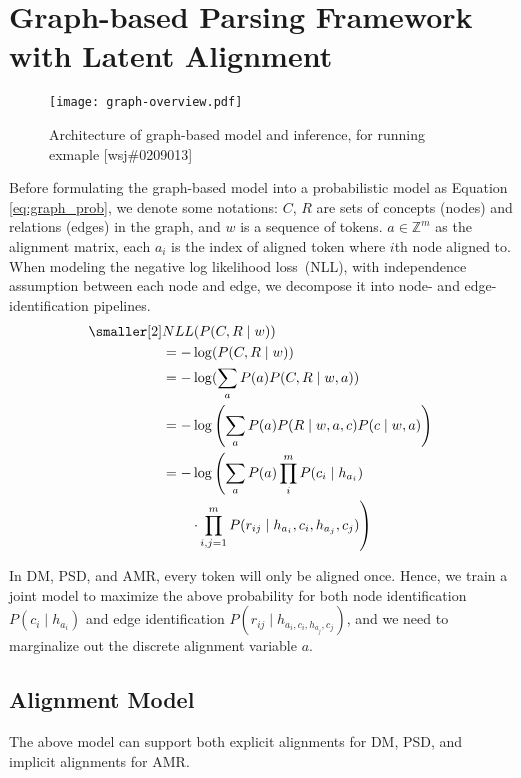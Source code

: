 \section{Graph-based Parsing Framework with Latent Alignment}
\label{sec:lex:graph-based}

\begin{figure}[h]
\centering
\texttt{[image: graph-overview.pdf]}
\caption{\label{fig:graph-based-inference} Architecture of graph-based model and inference, for running exmaple [wsj\#0209013]}
\end{figure}

Before formulating the graph-based model into a probabilistic model as
Equation \ref{eq:graph_prob}, we denote some notations: $C$, $R$ are
sets of concepts (nodes) and relations (edges) in the graph, and $w$
is a sequence of tokens.  $a \in {\mathbb{Z}}^m$ as the alignment
matrix, each $a_{i}$ is the index of aligned token where $i$th node
aligned to. When modeling the negative log likelihood loss~(NLL), with
independence assumption between each node and edge, we decompose it
into node- and edge-identification pipelines.
\begin{equation}
  \label{eq:graph_prob}
\begin{aligned} \smaller[2]
 & NLL(P(C,R \mid w)) \\
 & = - \log(P(C,R \mid w)) \\
 & = - \log(\sum_{a}{P(a) P(C,R \mid w,a)}) \\
 & = - \log\left(\sum_{a}P(a) P(R\mid w,a,c) P(c \mid w, a)\right) \\
 & = - \log\left(\sum_{a}P(a) \prod_{i}^{m} P(c_{i} \mid h_{a_{i}}) \right. \\
 & \qquad \left.\cdot \prod_{i,j=1}^{m}P(r_{ij} \mid h_{a_{i}}, c_{i}, h_{a_{j}}, c_{j})\right)
\end{aligned}
\end{equation}

In DM, PSD, and AMR, every token will only be aligned once.  Hence, we
train a joint model to maximize the above probability for both node
identification $P(c_{i} \mid h_{a_{i}})$ and edge identification
$P(r_{ij} \mid h_{{a_{i}}, c_{i},h_{a_{j}}, c_{j}})$, and we need to
marginalize out the discrete alignment variable $a$.

\subsection{Alignment Model}
The above model can support both explicit alignments for DM, PSD, and implicit alignments for AMR.

